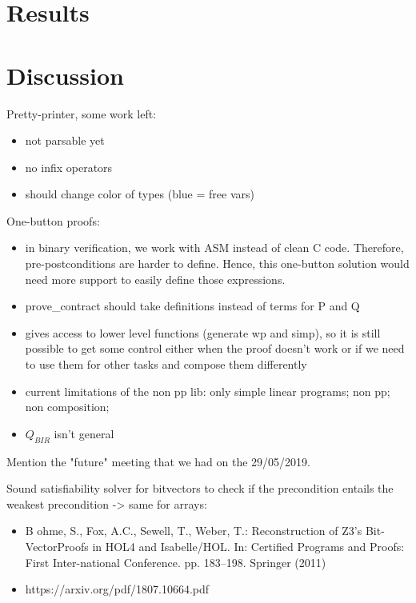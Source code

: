 \documentclass{kththesis}
\begin{document}
\section{Results}


\section{Discussion}

Pretty-printer, some work left:

\begin{itemize}
    \item not parsable yet
    \item no infix operators
    \item should change color of types (blue = free vars)
\end{itemize}

One-button proofs:

\begin{itemize}
    \item in binary verification, we work with ASM instead of clean C code. Therefore, pre-postconditions are harder to define. Hence, this one-button solution would need more support to easily define those expressions.
    \item prove\_contract should take definitions instead of terms for P and Q
    \item gives access to lower level functions (generate wp and simp), so it is still possible to get some control either when the proof doesn't work or if we need to use them for other tasks and compose them differently
    \item current limitations of the non pp lib: only simple linear programs; non pp; non composition;
    \item $Q_{BIR}$ isn't general
\end{itemize}

Mention the "future" meeting that we had on the 29/05/2019.

Sound satisfiability solver for bitvectors to check if the precondition entails the weakest precondition -> same for arrays:

\begin{itemize}
    \item B ohme,  S.,  Fox,  A.C.,  Sewell,  T.,  Weber,  T.:  Reconstruction  of  Z3's  Bit-VectorProofs in HOL4 and Isabelle/HOL. In: Certified Programs and Proofs: First Inter-national Conference. pp. 183--198. Springer (2011)
    \item https://arxiv.org/pdf/1807.10664.pdf
\end{itemize}
\end{document}
